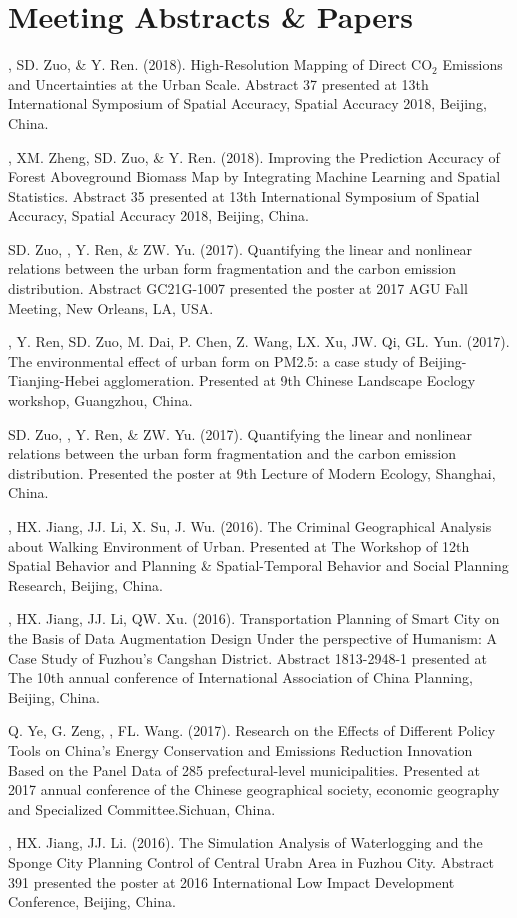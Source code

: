 \section*{Meeting Abstracts \& Papers}
\begin{etaremune}
\item
    \Shaoqing, SD. Zuo, \& Y. Ren. (2018).
    High-Resolution Mapping of Direct CO$_2$ Emissions and Uncertainties at the Urban Scale.
    Abstract 37 presented at 13th International Symposium of Spatial Accuracy, Spatial Accuracy 2018, Beijing, China.
\item
    \Shaoqing\CF, XM. Zheng, SD. Zuo, \& Y. Ren. (2018).
    Improving the Prediction Accuracy of Forest Aboveground Biomass Map by Integrating Machine Learning and Spatial Statistics.
    Abstract 35 presented at 13th International Symposium of Spatial Accuracy, Spatial Accuracy 2018, Beijing, China.
\item
    SD. Zuo, \Shaoqing, Y. Ren, \&  ZW. Yu. (2017).
    Quantifying the linear and nonlinear relations between the urban form fragmentation and the carbon emission distribution.
    Abstract GC21G-1007 presented the poster at 2017 AGU Fall Meeting, New Orleans, LA, USA.
\item
    \Shaoqing, Y. Ren, SD. Zuo, M. Dai, P. Chen, Z. Wang, LX. Xu, JW. Qi, GL. Yun. (2017).
    The environmental effect of urban form on PM2.5: a case study of Beijing-Tianjing-Hebei agglomeration.
    Presented at 9th Chinese Landscape Eoclogy workshop, Guangzhou, China.
\item
    SD. Zuo, \Shaoqing, Y. Ren, \&  ZW. Yu. (2017).
    Quantifying the linear and nonlinear relations between the urban form fragmentation and the carbon emission distribution.
    Presented the poster at 9th Lecture of Modern Ecology, Shanghai, China.
\item
    \Shaoqing, HX. Jiang, JJ. Li, X. Su, J. Wu. (2016).
    The Criminal Geographical Analysis about Walking Environment of Urban.
    Presented at The Workshop of 12th Spatial Behavior and Planning \& Spatial-Temporal Behavior and Social Planning Research, Beijing, China.
\item
    \Shaoqing, HX. Jiang, JJ. Li, QW. Xu. (2016).
    Transportation Planning of Smart City on the Basis of Data Augmentation Design Under the perspective of Humanism: A Case Study of Fuzhou’s Cangshan District.
    Abstract 1813-2948-1 presented at The 10th annual conference of International Association of China Planning, Beijing, China.
\item
    Q. Ye, G. Zeng, \Shaoqing, FL. Wang. (2017).
     Research on the Effects of Different Policy Tools on China’s Energy Conservation and Emissions Reduction Innovation Based on the Panel Data of 285 prefectural-level municipalities.
     Presented at 2017 annual conference of the Chinese geographical society, economic geography and Specialized Committee.Sichuan, China.
\item
    \Shaoqing, HX. Jiang, JJ. Li. (2016).
    The Simulation Analysis of Waterlogging and the Sponge City Planning Control of Central Urabn Area in Fuzhou City.
    Abstract 391 presented the poster at 2016 International Low Impact Development Conference, Beijing, China.
\end{etaremune}
